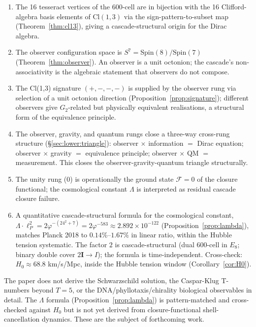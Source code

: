 \documentclass[12pt]{article}
\newcommand{\Fcal}{\mathcal{F}}
\newcommand{\twoI}{2\mathbf{I}}
\begin{document}
\begin{enumerate}
    \item The 16 tesseract vertices of the 600-cell are in bijection with the 16 Clifford-algebra basis elements of $\mathrm{Cl}(1,3)$ via the sign-pattern-to-subset map (Theorem~\ref{thm:cl13}), giving a cascade-structural origin for the Dirac algebra.
    \item The observer configuration space is $S^7 = \mathrm{Spin}(8) / \mathrm{Spin}(7)$ (Theorem~\ref{thm:observer}). An observer is a unit octonion; the cascade's non-associativity is the algebraic statement that observers do not compose.
    \item The Cl(1,3) signature $(+, -, -, -)$ is supplied by the observer rung via selection of a unit octonion direction (Proposition~\ref{prop:signature}); different observers give $G_2$-related but physically equivalent realisations, a structural form of the equivalence principle.
    \item The observer, gravity, and quantum rungs close a three-way cross-rung structure (§\ref{sec:lower:triangle}): observer $\times$ information $=$ Dirac equation; observer $\times$ gravity $=$ equivalence principle; observer $\times$ QM $=$ measurement. This closes the observer-gravity-quantum triangle structurally.
    \item The unity rung (0) is operationally the ground state $\Fcal = 0$ of the closure functional; the cosmological constant $\Lambda$ is interpreted as residual cascade closure failure.
    \item A quantitative cascade-structural formula for the cosmological constant, $\Lambda \cdot \ell_P^2 = 2 \varphi^{-(24^2 + 7)} = 2 \varphi^{-583} \approx 2.892 \times 10^{-122}$ (Proposition~\ref{prop:lambda}), matches Planck 2018 to $0.14\%$--$1.67\%$ in linear ratio, within the Hubble tension systematic. The factor $2$ is cascade-structural (dual 600-cell in $E_8$; binary double cover $\twoI \to I$); the formula is time-independent. Cross-check: $H_0 \approx 68.8$ km/s/Mpc, inside the Hubble tension window (Corollary~\ref{cor:H0}).
\end{enumerate}

The paper does not derive the Schwarzschild solution, the Caspar-Klug T-numbers beyond $T = 5$, or the DNA/phyllotaxis/chirality biological observables in detail. The $\Lambda$ formula (Proposition~\ref{prop:lambda}) is pattern-matched and cross-checked against $H_0$ but is not yet derived from closure-functional shell-cancellation dynamics. These are the subject of forthcoming work.
\end{document}
